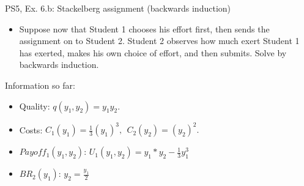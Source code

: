 \begin{frame}{PS5, Ex. 6.b: Stackelberg assignment (backwards induction)}
    \begin{itemize}
    \item[(b)] Suppose now that Student 1 chooses his effort first, then sends the assignment on to Student 2. Student 2 observes how much exert Student 1 has exerted, makes his own choice of effort, and then submits. Solve by backwards induction.
    \end{itemize}
    \vfill\null
  \begin{multicols}{2}
    \vfill\null \columnbreak
    Information so far:
    \begin{itemize}
        \item[1] Quality: $q(y_1, y_2) = y_1y_2.$
        \item[2] Costs: $C_1(y_1) = \frac{1}{3}(y_1)^3,\ \ C_2(y_2) = (y_2)^2.$
        \item[3] $Payoff_1(y_1,y_2)$: $U_1(y_1,y_2) = y_1*y_2-\frac{1}{3}y_1^3$ \\
        \item[4] $BR_2(y_1)$: $y_2 = \frac{y_1}{2}$ \\
    \end{itemize}
    \vfill\null
  \end{multicols}
\end{frame}
